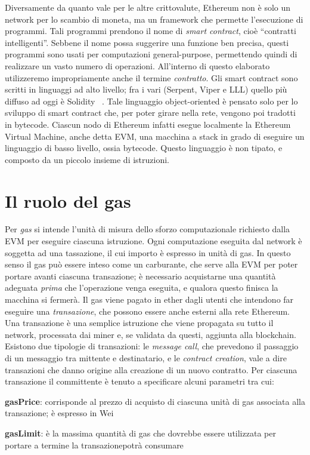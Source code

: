 \indent Diversamente da quanto vale per le altre crittovalute, Ethereum non è solo un network per lo scambio di moneta, ma un framework che permette l'esecuzione di programmi. Tali programmi prendono il nome di \textit{smart contract}, cioè ``contratti intelligenti''. Sebbene il nome possa suggerire una funzione ben precisa, questi programmi sono usati per computazioni general-purpose, permettendo quindi di realizzare un vasto numero di operazioni. All'interno di questo elaborato utilizzeremo impropriamente anche il termine \textit{contratto}.\newline
\indent Gli smart contract sono scritti in linguaggi ad alto livello; fra i vari (Serpent, Viper e LLL) quello più diffuso ad oggi è Solidity ~\cite{ethereum/solidity_2019}.  Tale linguaggio object-oriented è pensato solo per lo sviluppo di smart contract che, per poter girare nella rete, vengono poi tradotti in bytecode. Ciascun nodo di Ethereum infatti esegue localmente la Ethereum Virtual Machine, anche detta EVM, una macchina a stack in grado di eseguire un linguaggio di basso livello, ossia bytecode. Questo linguaggio è non tipato, e composto da un piccolo insieme di istruzioni.\newline 

\section{Il ruolo del gas}

Per \textit{gas} si intende l'unità di misura dello sforzo computazionale richiesto dalla EVM per eseguire ciascuna istruzione. Ogni computazione eseguita dal network è 
soggetta ad una tassazione, il cui importo è espresso in
unità di gas. In questo senso il gas può essere inteso come
un carburante, che serve alla EVM per poter portare avanti ciascuna transazione; è necessario acquistarne una quantità adeguata \textit{prima} che l'operazione venga eseguita, e qualora questo finisca la macchina si fermerà.\newline
\indent Il gas viene pagato in ether dagli utenti che intendono far eseguire una \textit{transazione}, che possono essere anche esterni alla rete Ethereum. Una transazione è una semplice istruzione che viene propagata su tutto il network, processata dai miner e, se validata da questi, aggiunta alla blockchain. Esistono due tipologie di transazioni: le \textit{message call}, che prevedono il passaggio di un messaggio tra mittente e destinatario, e le \textit{contract creation}, vale a dire transazioni che danno origine alla creazione di un nuovo contratto. Per ciascuna transazione il committente è tenuto a specificare alcuni parametri tra cui:
\begin{description}
 \item \textbf{gasPrice}: corrisponde al prezzo di acquisto di ciascuna unità di gas associata alla transazione; è espresso in Wei
 \item \textbf{gasLimit}: è la massima quantità di gas che dovrebbe essere utilizzata per portare a termine la transazionepotrà consumare
\end{description}

